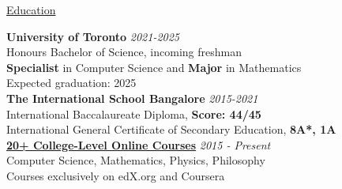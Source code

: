 \documentclass{resume} %
\begin{document}

\begin{rSection}{\href{google.com}{Education}}

{\bf University of Toronto} \hfill {\em 2021-2025} \\ 
Honours Bachelor of Science, incoming freshman \\
\textbf{Specialist} in Computer Science and \textbf{Major} in Mathematics \smallskip \\
Expected graduation: 2025  \\

{\bf The International School Bangalore} \hfill {\em 2015-2021} \\ 
International Baccalaureate Diploma, \textbf{Score: 44/45}  \\
International General Certificate of Secondary Education, \textbf{8A*, 1A}\\

{\bf \href{https://nitvishn-website.netlify.app/education}{20+ College-Level Online Courses}} \hfill{\em 2015 - Present}\\
Computer Science, Mathematics, Physics, Philosophy  \\
Courses exclusively on edX.org and Coursera\\

\end{rSection}





\end{document}
